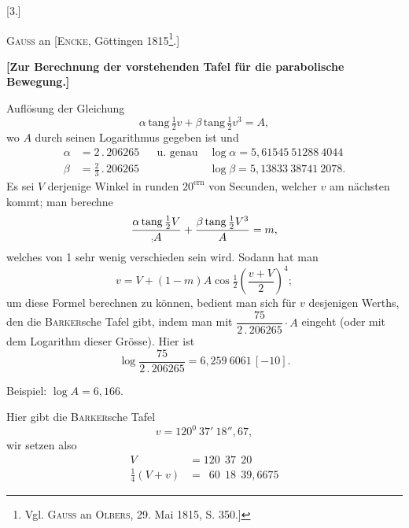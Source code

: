 \clearpage
{}
\begingroup
\makeatletter
\newcommand{\LetterThreeFirstNote}[1]{\begingroup\renewcommand{\thefootnote}{*)}\long\def\@makefntext##1{\noindent [*)\ ##1}\footnote{#1}\endgroup}
\makeatother
\begin{center}
[3.]\par\medskip
\textsc{Gauss} an [\textsc{Encke}, Göttingen 1815\LetterThreeFirstNote{Vgl. \textsc{Gauss} an \textsc{Olbers}, 29. Mai 1815, S. 350.]}.]\par\medskip
{\bfseries [Zur Berechnung der vorstehenden Tafel für die parabolische Bewegung.]}
\end{center}
\noindent\hspace*{\parindent}Auflösung der Gleichung
\[
\alpha\,\mathrm{tang}\,\tfrac12v+\beta\,\mathrm{tang}\,\tfrac12v^3=A,
\]
wo \(A\) durch seinen Logarithmus gegeben ist und
\[
\begin{aligned}
\alpha&=2\mathpunct{.}206265&&\text{u. genau}\quad\log\alpha=5{,}61545\ 51288\ 4044\\
\beta&=\tfrac23\mathpunct{.}206265&&\phantom{\text{u. genau}\quad}\log\beta=5{,}13833\ 38741\ 2078.
\end{aligned}
\]
Es sei \(V\) derjenige Winkel in runden \(20^{\mathrm{ern}}\) von Secunden, welcher \(v\) am nächsten kommt; man berechne
\[
\frac{\alpha\,\mathrm{tang}\,\tfrac12V}{\mathord{\text{\raisebox{-.35ex}{\(\scriptstyle:\)}}}A}
+\frac{\beta\,\mathrm{tang}\,\tfrac12V^3}{A}=m,
\]
welches von 1 sehr wenig verschieden sein wird. Sodann hat man
\[
v=V+(1-m)A\cos\tfrac12\left(\frac{v+V}{2}\right)^4;
\]
um diese Formel berechnen zu können, bedient man sich für \(v\) desjenigen Werths, den die \textsc{Barker}sche Tafel gibt, indem man mit \(\dfrac{75}{2\mathpunct{.}206265}\cdot A\) eingeht (oder mit dem Logarithm dieser Grösse). Hier ist
\[
\log\frac{75}{2\mathpunct{.}206265}=6{,}259\ 6061\,[-10].
\]
\par\medskip
\noindent\hspace*{2\parindent}Beispiel: \(\log A=6{,}166.\)
\par
\noindent\hspace*{\parindent}Hier gibt die \textsc{Barker}sche Tafel
\[
v=120^0\ 37'\ 18''{,}67,
\]
wir setzen also
\[
\begin{aligned}
V&=120\ \ 37\ \ 20\\
\tfrac14(V+v)&=\phantom1 60\ \ 18\ \ 39{,}6675
\end{aligned}
\]
